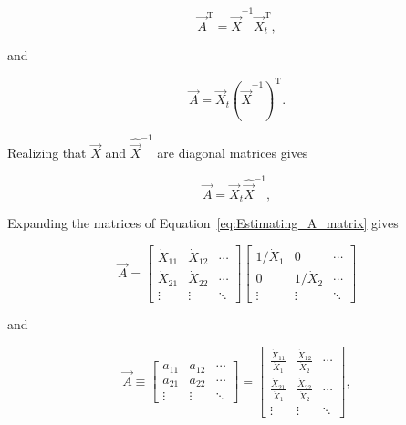 \begin{equation}\label{eq:Xdifference1Proof-9}
	\vec{A}^\mathrm{T} 
	= \hat{\vec{X}}^{-1} 
	\vec{X}_{t}^\mathrm{T},
\end{equation}

\noindent{}and

\begin{equation}\label{eq:Xdifference1Proof-10}
	\vec{A} 
	= \vec{X}_{t}
	{\left( {\hat{\vec{X}}^{-1}} \right)}^\mathrm{T}.
\end{equation}

\noindent{}Realizing that $\hat{\vec{X}}$ and $\hat{\vec{X}}^{-1}$
are diagonal matrices gives

\begin{equation}\label{eq:Estimating_A_matrix} 
	\vec{A} 
	= \vec{X}_{t}
	\hat{\vec{X}}^{-1},
\end{equation}

\noindent{}Expanding the matrices of Equation~\ref{eq:Estimating_A_matrix} gives

\begin{equation}
	\vec{A}
	=
	\begin{bmatrix}
		\dot{X}_{11} & \dot{X}_{12} & \cdots \\
		\dot{X}_{21} & \dot{X}_{22} & \cdots \\
		\vdots       & \vdots       & \ddots
	\end{bmatrix}
	\begin{bmatrix}
		1/\dot{X}_{1} & 0             & \cdots \\
		0             & 1/\dot{X}_{2} & \cdots \\
		\vdots        & \vdots        & \ddots
	\end{bmatrix}
\end{equation}

\noindent{}and

\begin{equation}
	\vec{A}
	\equiv
	\begin{bmatrix}
		a_{11} & a_{12} & \cdots \\
		a_{21} & a_{22} & \cdots \\
		\vdots & \vdots & \ddots
	\end{bmatrix}
	=
	\begin{bmatrix}
		\frac{\dot{X}_{11}}{\dot{X}_{1}} & \frac{\dot{X}_{12}}{\dot{X}_{2}} & \cdots \\
		\frac{\dot{X}_{21}}{\dot{X}_{1}} & \frac{\dot{X}_{22}}{\dot{X}_{2}} & \cdots \\
		\vdots       & \vdots       & \ddots
	\end{bmatrix},
\end{equation}


